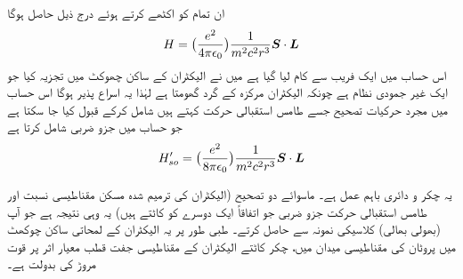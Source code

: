  ان تمام کو اکٹھے کرتے ہوئے درج ذیل حاصل ہوگا 
\begin{align*}
H = \big ( \frac{e^2}{4 \pi \epsilon_0} \big ) \frac{1}{m^2 c^2 r^3} {{\boldsymbol{S}}} \cdot {\ensuremath{{\boldsymbol{L}}}}
\end{align*}
اس حساب میں ایک  فریب سے کام لیا گیا ہے میں نے الیکٹران کے ساکن  چھوکٹ میں تجزیہ کیا جو ایک غیر جمودی نظام ہے چونکہ الیکٹران مرکزہ کے گرد گھومتا ہے لہٰذا   یہ اسراع  پذیر ہوگا اس حساب میں مجرد حرکیات تصحیح جسے طامس استقبالی حرکت کہتے ہیں شامل کرکے قبول کیا جا سکتا ہے جو حساب میں جزو ضربی  شامل کرتا ہے 
\begin{align}
H'_{so} = \big ( \frac{e^2}{8 \pi \epsilon_0} \big ) \frac{1}{m^2 c^2 r^3} {{\boldsymbol{S}}} \cdot {\ensuremath{{\boldsymbol{L}}}}
\end{align}


یہ چکر و دائری  باہم عمل ہے۔ ماسوائے دو تصحیح (الیکٹران کی ترمیم شدہ مسکن مقناطیسی نسبت  اور طامس استقبالی حرکت جزو ضربی جو اتفاقاً ایک دوسرے کو کاٹتے  ہیں)  یہ وہی نتیجہ ہے جو آپ (بھولی بھالی)  کلاسیکی نمونہ سے حاصل کرتے۔ طبی طور پر یہ الیکٹران کے لمحاتی ساکن چوکھٹ میں پروٹان کی مقناطیسی میدان میں، چکر کاٹتے الیکٹران کے مقناطیسی جفت قطب معیار اثر پر قوت مروڑ کی بدولت ہے۔

